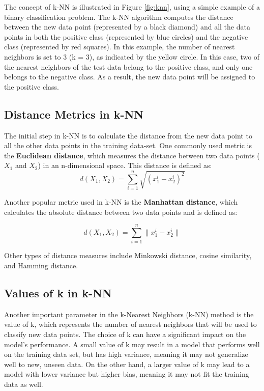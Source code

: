 The concept of k-NN is illustrated in Figure \ref{fig:knn}, using a simple example of a binary classification problem. The k-NN algorithm computes the distance between the new data point (represented by a black diamond) and all the data points in both the positive class (represented by blue circles) and the negative class (represented by red squares). In this example, the number of nearest neighbors is set to 3 (k = 3), as indicated by the yellow circle. In this case, two of the nearest neighbors of the test data belong to the positive class, and only one belongs to the negative class. As a result, the new data point will be assigned to the positive class.



\subsection{Distance Metrics in k-NN}
The initial step in k-NN is to calculate the distance from the new data point to all the other data points in the training data-set. One commonly used metric is the \textbf{Euclidean distance}, which measures the distance between two data points ($X_1$ and $X_2$) in an n-dimensional space. This distance is defined as:
\begin{equation}\label{eqn:eud}
  d(X_1, X_2) = \sum_{i=1}^n \sqrt{(x_1^i-x_2^i)^2}
\end{equation}

Another popular metric used in k-NN is the\textbf{ Manhattan distance}, which calculates the absolute distance between two data points and is defined as:

\begin{equation}\label{eqn:mah}
  d(X_1, X_2) = \sum_{i=1}^n \| x_1^i- x_2^i \|
\end{equation}

Other types of distance measures include Minkowski distance, cosine similarity, and Hamming distance.

\newpage
\subsection{Values of k in k-NN}
Another important parameter in the k-Nearest Neighbors (k-NN) method is the value of k, which represents the number of nearest neighbors that will be used to classify new data points. The choice of k can have a significant impact on the model's performance. A small value of k may result in a model that performs well on the training data set, but has high variance, meaning it may not generalize well to new, unseen data. On the other hand, a larger value of k may lead to a model with lower variance but higher bias, meaning it may not fit the training data as well.

